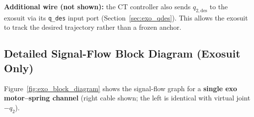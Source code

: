 \documentclass[11pt,a4paper]{article}
\begin{document}
\begin{warnbox}
\textbf{Additional wire (not shown):} the CT controller also sends
$q_{2,\mathrm{des}}$ to the exosuit via its \texttt{q\_des} input port
(Section~\ref{sec:exo_qdes}).  This allows the exosuit to track the desired
trajectory rather than a frozen anchor.
\end{warnbox}

\subsection{Detailed Signal-Flow Block Diagram (Exosuit Only)}
\label{sec:exo_block_diagram}

Figure~\ref{fig:exo_block_diagram} shows the signal-flow graph for a
\textbf{single exo motor--spring channel} (right cable shown; the left is
identical with virtual joint $-q_2$).
\end{document}

